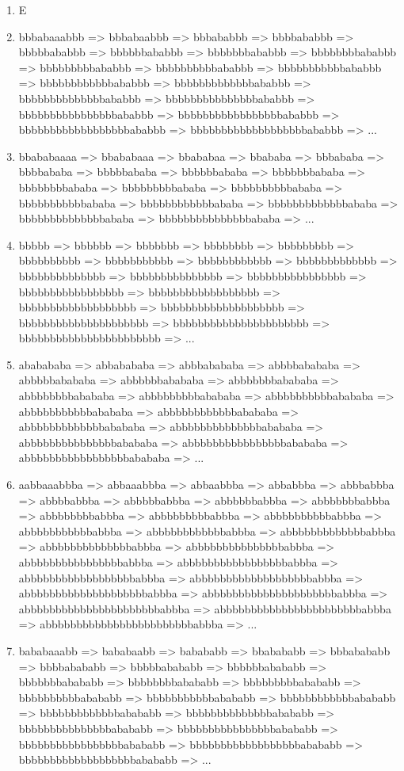 \documentclass{article}
\begin{document}
\begin{enumerate}
\begin{enumerate}
\item E

\item bbbabaaabbb => bbbabaabbb => bbbababbb => bbbbababbb => bbbbbababbb => bbbbbbababbb => bbbbbbbababbb => bbbbbbbbababbb => bbbbbbbbbababbb => bbbbbbbbbbababbb => bbbbbbbbbbbababbb => bbbbbbbbbbbbababbb => bbbbbbbbbbbbbababbb => bbbbbbbbbbbbbbababbb => bbbbbbbbbbbbbbbababbb => bbbbbbbbbbbbbbbbababbb => bbbbbbbbbbbbbbbbbababbb => bbbbbbbbbbbbbbbbbbababbb => bbbbbbbbbbbbbbbbbbbababbb => ...

\item bbababaaaa => bbababaaa => bbababaa => bbababa => bbbababa => bbbbababa => bbbbbababa => bbbbbbababa => bbbbbbbababa => bbbbbbbbababa => bbbbbbbbbababa => bbbbbbbbbbababa => bbbbbbbbbbbababa => bbbbbbbbbbbbababa => bbbbbbbbbbbbbababa => bbbbbbbbbbbbbbababa => bbbbbbbbbbbbbbbababa => ...

\item bbbbb => bbbbbb => bbbbbbb => bbbbbbbb => bbbbbbbbb => bbbbbbbbbb => bbbbbbbbbbb => bbbbbbbbbbbb => bbbbbbbbbbbbb => bbbbbbbbbbbbbb => bbbbbbbbbbbbbbb => bbbbbbbbbbbbbbbb => bbbbbbbbbbbbbbbbb => bbbbbbbbbbbbbbbbbb => bbbbbbbbbbbbbbbbbbb => bbbbbbbbbbbbbbbbbbbb => bbbbbbbbbbbbbbbbbbbbb => bbbbbbbbbbbbbbbbbbbbbb => bbbbbbbbbbbbbbbbbbbbbbb => ...

\item ababababa => abbabababa => abbbabababa => abbbbabababa => abbbbbabababa => abbbbbbabababa => abbbbbbbabababa => abbbbbbbbabababa => abbbbbbbbbabababa => abbbbbbbbbbabababa => abbbbbbbbbbbabababa => abbbbbbbbbbbbabababa => abbbbbbbbbbbbbabababa => abbbbbbbbbbbbbbabababa => abbbbbbbbbbbbbbbabababa => abbbbbbbbbbbbbbbbabababa => abbbbbbbbbbbbbbbbbabababa => ...

\item aabbaaabbba => abbaaabbba => abbaabbba => abbabbba => abbbabbba => abbbbabbba => abbbbbabbba => abbbbbbabbba => abbbbbbbabbba => abbbbbbbbabbba => abbbbbbbbbabbba => abbbbbbbbbbabbba => abbbbbbbbbbbabbba => abbbbbbbbbbbbabbba => abbbbbbbbbbbbbabbba => abbbbbbbbbbbbbbabbba => abbbbbbbbbbbbbbbabbba => abbbbbbbbbbbbbbbbabbba => abbbbbbbbbbbbbbbbbabbba => abbbbbbbbbbbbbbbbbbabbba => abbbbbbbbbbbbbbbbbbbabbba => abbbbbbbbbbbbbbbbbbbbabbba => abbbbbbbbbbbbbbbbbbbbbabbba => abbbbbbbbbbbbbbbbbbbbbbabbba => abbbbbbbbbbbbbbbbbbbbbbbabbba => abbbbbbbbbbbbbbbbbbbbbbbbabbba =>  ...

\item bababaaabb => bababaabb => babababb => bbabababb => bbbabababb => bbbbabababb => bbbbbabababb => bbbbbbabababb => bbbbbbbabababb => bbbbbbbbabababb => bbbbbbbbbabababb => bbbbbbbbbbabababb => bbbbbbbbbbbabababb => bbbbbbbbbbbbabababb => bbbbbbbbbbbbbabababb => bbbbbbbbbbbbbbabababb => bbbbbbbbbbbbbbbabababb => bbbbbbbbbbbbbbbbabababb => bbbbbbbbbbbbbbbbbabababb => bbbbbbbbbbbbbbbbbbabababb => bbbbbbbbbbbbbbbbbbbabababb =>  ...


    
\end{enumerate}


    
\end{enumerate}
\end{document}
